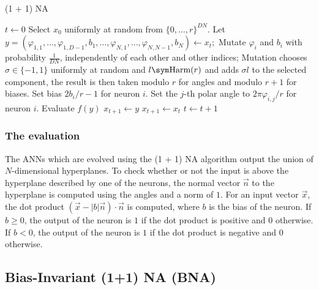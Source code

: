 \begin{algorithm}
\caption{(1 + 1) NA}
\label{alg:na}
\begin{algorithmic}
    \State $t \gets 0$
    \State Select $x_0$ uniformly at random from $\{0, \ldots, r\}^{DN}$.
        \State Let $y = (\varphi_{1,1}, \ldots, \varphi_{1,D-1}, b_1, \ldots, \varphi_{N,1}, \ldots, \varphi_{N,N-1}, b_N) \gets x_t;$
            \State Mutate $\varphi_i$ and $b_i$ with probability $\frac{1}{DN}$, independently of each other and other indices;
            \State Mutation chooses $\sigma \in \{-1, 1\}$ uniformly at random and $l \sym \text{Harm}(r)$ and adds $\sigma l$ to the selected component, the
            result is then taken modulo $r$ for angles and modulo $r + 1$ for biases.
                \State Set bias $2b_i / r - 1$ for neuron $i$.
                    \State Set the $j$-th polar angle to $2\pi \varphi_{i,j} / r$ for neuron $i$.
                \EndFor
            \EndFor
            \State Evaluate $f(y)$
                \State $x_{t+1} \gets y$
            \Else
                \State $x_{t+1} \gets x_t$
            \EndIf
        \EndFor
        \State $t \gets t + 1$
    \EndWhile
\end{algorithmic}
\end{algorithm}

\subsubsection{The evaluation}

The ANNs which are evolved using the (1 + 1) NA algorithm output the union of $N$-dimensional hyperplanes. To check whether or not the input is above the
hyperplane described by one of the neurons, the normal vector $\overrightarrow{n}$ to the hyperplane is computed using the angles and a norm of $1$.
For an input vector $\overrightarrow{x}$, the dot product $(\overrightarrow{x} - \lvert b \rvert \overrightarrow{n}) \cdot \overrightarrow{n}$ is computed, where
$b$ is the bias of the neuron. If $b \geq 0$, the output of the neuron is $1$ if the dot product is positive and $0$ otherwise. If $b < 0$,
the output of the neuron is $1$ if the dot product is negative and $0$ otherwise.

\subsection{Bias-Invariant (1+1) NA (BNA)}

